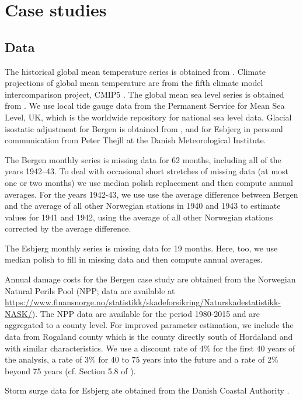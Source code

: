 \documentclass[note,screen,british,11pt]{nrdoc}
\begin{document}
\section{Case studies}
\label{cases}

\subsection{Data}
The historical global mean temperature series is obtained from \citet{giss}. Climate projections of global mean temperature are from the fifth climate model intercomparison project, CMIP5 \citep{cmip5}. The global mean sea level series is obtained from \citet{csiro}. We use local tide gauge data from the Permanent Service for Mean Sea Level, UK, which is the worldwide repository for national sea level data. Glacial isostatic adjustment for Bergen is obtained from \citet{Simpson2014}, and for Esbjerg in personal communication from Peter Thejll at the Danish Meteorological Institute. 

The Bergen monthly series is missing data for 62 months, including all of the years 1942--43. To deal with occasional short stretches of missing data (at most one or two months) we use median polish replacement \citep{medpol} and then compute annual averages. For the years 1942-43, we use use the average difference between Bergen and the average of all other Norwegian stations in 1940 and 1943 to estimate values for 1941 and 1942, using the average of all other Norwegian stations corrected by the average difference. 

The Esbjerg monthly series is missing data for 19 months. Here, too, we use median polish to fill in missing data and then compute annual averages.

Annual damage costs for the Bergen case study are obtained from the Norwegian Natural Perils Pool (NPP;  data are available at \url{https://www.finansnorge.no/statistikk/skadeforsikring/Naturskadestatistikk-NASK/}). The NPP data are available for the period 1980-2015 and are aggregated to a county level. For improved parameter estimation, we include the data from Rogaland county which is the county directly south of Hordaland and with similar characteristics. We use a discount rate of 4\% for the first 40 years of the analysis, a rate of 3\% for 40 to 75 years into the future and a rate of 2\% beyond 75 years (cf. Section 5.8 of \citet{DiscountRate}).  

Storm surge data for Esbjerg ate obtained from the Danish Coastal Authority \citep{sealevel2012}.
\end{document}
